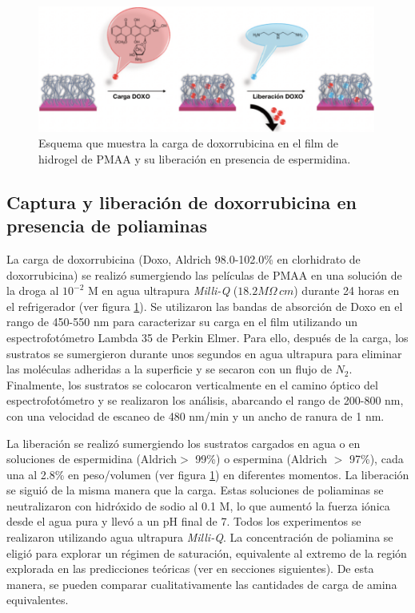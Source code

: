 \begin{figure}[htb]
	\centering
	\includegraphics[width=0.99\textwidth]{Figures/graph-film/exp_doxo_load_scheme.pdf}
	\caption{Esquema que muestra la carga de doxorrubicina en el film de hidrogel de PMAA y su liberaci\'on en presencia de espermidina.}
	\label{fig:film:exp_doxo_scheme}
\end{figure}



\subsection{Captura y liberaci\'on de doxorrubicina en presencia de poliaminas}


La carga de doxorrubicina (Doxo, Aldrich 98.0-102.0\% en clorhidrato de doxorrubicina) se realiz\'o sumergiendo las pel\'iculas de PMAA en una soluci\'on de la droga al $10^{-2}$ M en agua ultrapura \textit{Milli-Q} ($18.2 M \Omega \, cm$) durante 24 horas en el refrigerador (ver figura \ref{fig:film:exp_doxo_scheme}). Se utilizaron las bandas de absorci\'on de Doxo en el rango de 450-550 nm para caracterizar su carga en el film utilizando un espectrofot\'ometro Lambda 35 de Perkin Elmer. Para ello, despu\'es de la carga, los sustratos se sumergieron durante unos segundos en agua ultrapura para eliminar las mol\'eculas adheridas a la superficie y se secaron con un flujo de $N_2$. Finalmente, los sustratos se colocaron verticalmente en el camino \'optico del espectrofot\'ometro y se realizaron los an\'alisis, abarcando el rango de 200-800 nm, con una velocidad de escaneo de 480 nm/min y un ancho de ranura de 1 nm.

La liberaci\'on se realiz\'o sumergiendo los sustratos cargados en agua o en soluciones de espermidina (Aldrich$ >$ 99\%) o espermina (Aldrich $>$ 97\%), cada una al 2.8\% en peso/volumen (ver figura \ref{fig:film:exp_doxo_scheme}) en diferentes momentos. La liberaci\'on se sigui\'o de la misma manera que la carga. Estas soluciones de poliaminas se neutralizaron con hidr\'oxido de sodio al 0.1 M, lo que aument\'o la fuerza i\'onica desde el agua pura y llev\'o a un pH final de 7. Todos los experimentos se realizaron utilizando agua ultrapura \textit{Milli-Q}. La concentraci\'on de poliamina se eligi\'o para explorar un r\'egimen de saturaci\'on, equivalente al extremo de la regi\'on explorada en las predicciones te\'oricas (ver en secciones siguientes). De esta manera, se pueden comparar cualitativamente las cantidades de carga de amina equivalentes.

